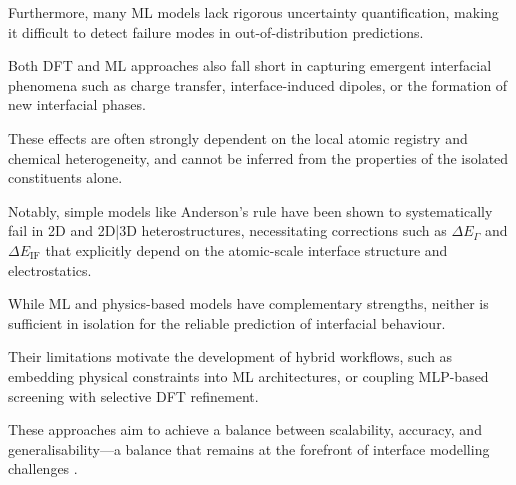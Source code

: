 Furthermore, many ML models lack rigorous uncertainty quantification, making it difficult to detect failure modes in
out-of-distribution predictions.


Both DFT and ML approaches also fall short in capturing emergent interfacial phenomena such as charge transfer,
interface-induced dipoles, or the formation of new interfacial phases.

These effects are often strongly dependent on the local atomic registry and chemical heterogeneity, and cannot be
inferred from the properties of the isolated constituents alone.

Notably, simple models like Anderson's rule have been shown to systematically fail in 2D and 2D|3D heterostructures,
necessitating corrections such as $\Delta E_\Gamma$ and $\Delta E_\mathrm{IF}$ that explicitly depend on the atomic-scale interface
structure and electrostatics.


While ML and physics-based models have complementary strengths, neither is sufficient in isolation for the reliable
prediction of interfacial behaviour.

Their limitations motivate the development of hybrid workflows, such as embedding physical constraints into ML
architectures, or coupling MLP-based screening with selective DFT refinement.

These approaches aim to achieve a balance between scalability, accuracy, and generalisability---a balance that remains at
the forefront of interface modelling challenges .

